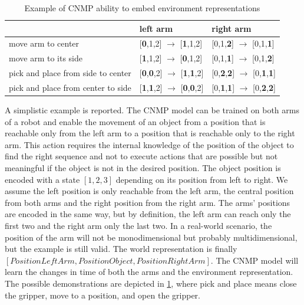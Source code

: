 \begin{longtable}[c]{|l|l|l|}
\caption{Example of CNMP ability to embed environment representations}
\label{tab:cnmp_env_represenation}\\
\hline
 & left arm & right arm \\ \hline
\endfirsthead
%
\endhead
%
move arm to center & [\textbf{0},1,2] $\rightarrow$ [\textbf{1},1,2] & [0,1,\textbf{2}] $\rightarrow$ [0,1,\textbf{1}] \\ \hline
move arm to its side & [\textbf{1},1,2] $\rightarrow$ [\textbf{0},1,2] & [0,1,\textbf{1}] $\rightarrow$ [0,1,\textbf{2}] \\ \hline
pick and place from side to center & [\textbf{0},\textbf{0},2] $\rightarrow$ [\textbf{1},\textbf{1},2] & [0,\textbf{2},\textbf{2}] $\rightarrow$ [0,\textbf{1},\textbf{1}] \\ \hline
pick and place from center to side & [\textbf{1},\textbf{1},2] $\rightarrow$ [\textbf{0},\textbf{0},2] & [0,\textbf{1},\textbf{1}] $\rightarrow$ [0,\textbf{2},\textbf{2}] \\ \hline
\end{longtable}

A simplistic example is reported. The CNMP model can be trained on both arms of a robot and enable the movement of an object from a position that is reachable only from the left arm to a position that is reachable only to the right arm. 
This action requires the internal knowledge of the position of the object to find the right sequence and not to execute actions that are possible but not meaningful if the object is not in the desired position. 
The object position is encoded with a state $[1,2,3]$ depending on its position from left to right. We assume the left position is only reachable from the left arm, the central position from both arms and the right position from the right arm. 
The arms' positions are encoded in the same way, but by definition, the left arm can reach only the first two and the right arm only the last two. In a real-world scenario, the position of the arm will not be monodimensional but probably multidimensional, but the example is still valid.
The world representation is finally $[PositionLeftArm, PositionObject, PositionRightArm]$. The CNMP model will learn the changes in time of both the arms and the environment representation. The possible demonstrations are depicted in \cref{tab:cnmp_env_represenation}, where pick and place means close the gripper, move to a position, and open the gripper.

